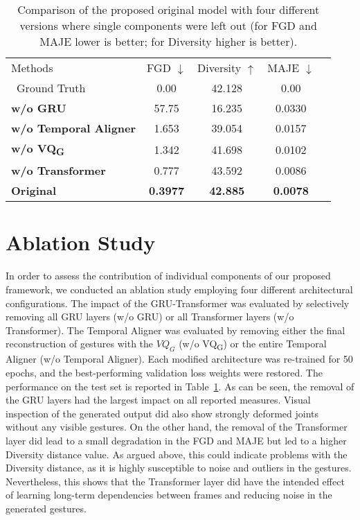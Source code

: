 \documentclass[sigconf]{acmart}
\begin{document}
\begin{table}[t]
  \centering
  \caption{Comparison of the proposed original model with four different versions where single components were left out (for FGD and MAJE lower is better; for Diversity higher is better).}
  \begin{tabular}{lcccc}
    \toprule
    Methods & FGD $\downarrow$ & Diversity $\uparrow$ & MAJE $\downarrow$\\\
    Ground Truth & 0.00 & 42.128 & 0.00\\
    \midrule
    \textbf{w/o GRU} & 57.75 & 16.235 & 0.0330\\
    \textbf{w/o Temporal Aligner} & 1.653 & 39.054 & 0.0157\\
    \textbf{w/o VQ\textsubscript{G}} & 1.342 & 41.698 & 0.0102\\
    
    \textbf{w/o Transformer} & 0.777 & 43.592 & 0.0086\\
    \midrule
    \textbf{Original} & \textbf{0.3977} & \textbf{42.885} & \textbf{0.0078}\\ 
    \bottomrule
  \end{tabular}
  \label{tbl:ablation}
\end{table}

\section{Ablation Study}
In order to assess the contribution of individual components of our proposed framework, we conducted an ablation study employing four different architectural configurations. The impact of the GRU-Transformer was evaluated by selectively removing all GRU layers (w/o GRU) or all Transformer layers (w/o Transformer). The Temporal Aligner was evaluated by removing either the final reconstruction of gestures with the $VQ_G$ (w/o VQ\textsubscript{G}) or the entire Temporal Aligner (w/o Temporal Aligner). Each modified architecture was re-trained for 50 epochs, and the best-performing validation loss weights were restored. The performance on the test set is reported in Table~\ref{tbl:ablation}. As can be seen, the removal of the GRU layers had the largest impact on all reported measures. Visual inspection of the generated output did also show strongly deformed joints without any visible gestures. On the other hand, the removal of the Transformer layer did lead to a small degradation in the FGD and MAJE but led to a higher Diversity distance value. As argued above, this could indicate problems with the Diversity distance, as it is highly susceptible to noise and outliers in the gestures. Nevertheless, this shows that the Transformer layer did have the intended effect of learning long-term dependencies between frames and reducing noise in the generated gestures. 
\end{document}
